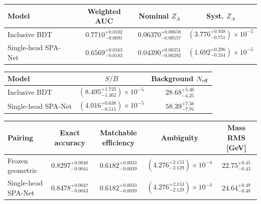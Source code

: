 \begin{tabular}{lccc}
\toprule
Model & Weighted AUC & Nominal $Z_A$ & Syst. $Z_A$ \\
\midrule
Inclusive BDT & $0.7710^{+0.0102}_{-0.0091}$ & $0.06370^{+0.00658}_{-0.00557}$ & $(3.776^{+0.938}_{-0.751})\times10^{-5}$ \\
Single-head SPA-Net & $0.6569^{+0.0163}_{-0.0183}$ & $0.04390^{+0.00351}_{-0.00292}$ & $(1.692^{+0.296}_{-0.244})\times10^{-5}$ \\
\bottomrule
\end{tabular}
\par\smallskip
\begin{tabular}{lcc}
\toprule
Model & $S/B$ & Background $N_{\rm eff}$ \\
\midrule
Inclusive BDT & $(8.495^{+1.723}_{-1.462})\times10^{-5}$ & $28.68^{+5.46}_{-4.25}$ \\
Single-head SPA-Net & $(4.016^{+0.638}_{-0.515})\times10^{-5}$ & $58.39^{+7.56}_{-7.91}$ \\
\bottomrule
\end{tabular}
\par\medskip
{\small
\begin{tabular}{lcccc}
\toprule
Pairing & Exact accuracy & Matchable efficiency & Ambiguity & Mass RMS [GeV] \\
\midrule
Frozen geometric & $0.8297^{+0.0040}_{-0.0041}$ & $0.6182^{+0.0033}_{-0.0039}$ & $(4.276^{+2.153}_{-2.129})\times10^{-4}$ & $22.75^{+0.45}_{-0.43}$ \\
Single-head SPA-Net & $0.8478^{+0.0047}_{-0.0043}$ & $0.6182^{+0.0033}_{-0.0039}$ & $(4.276^{+2.153}_{-2.129})\times10^{-4}$ & $24.64^{+0.49}_{-0.48}$ \\
\bottomrule
\end{tabular}
}
\par\medskip
